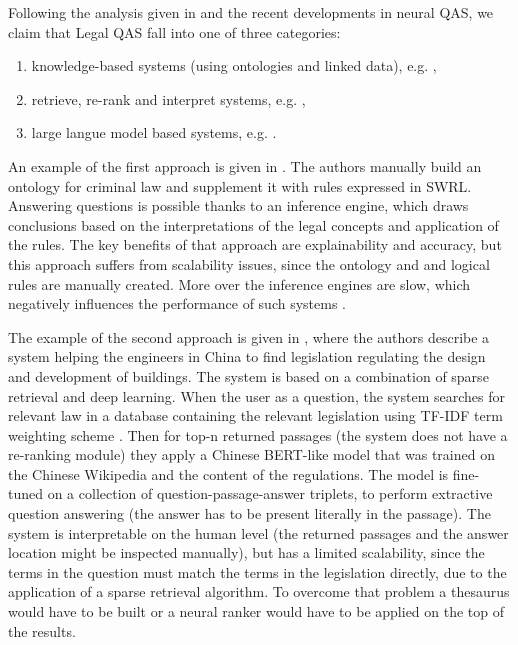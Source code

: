 Following the analysis given in \cite{martinez2023survey} and the recent developments in neural QAS, 
we claim that Legal QAS fall into one of three categories:
\begin{enumerate}
    \item knowledge-based systems (using ontologies and linked data), e.g. \cite{fawei2018methodology},
    \item retrieve, re-rank and interpret systems, e.g. \cite{zhong2020building},
    \item large langue model based systems, e.g. \cite{chung2022scaling}.
\end{enumerate}

An example of the first approach is given in \cite{fawei2018methodology}. The authors manually build an ontology
for criminal law and supplement it with rules expressed in SWRL. Answering questions is possible thanks
to an inference engine, which draws conclusions based on the interpretations of the legal concepts and 
application of the rules. The key benefits of that approach are explainability and accuracy, but this approach
suffers from scalability issues, since the ontology and and logical rules are manually created. More over 
the inference engines are slow, which negatively influences the performance of such systems \cite{martinez2023survey}.

The example of the second approach is given in \cite{zhong2020building}, where the authors describe a system
helping the engineers in China to find legislation regulating the design and development of buildings.
The system is based on a combination of sparse retrieval and deep learning. When the user as a question,
the system searches for relevant law in a database containing the relevant legislation using TF-IDF term
weighting scheme \cite{manning1999foundations}. Then for top-n returned passages (the system does not have a re-ranking
module) they apply a Chinese BERT-like model that was trained on the Chinese Wikipedia and the content of the 
regulations. The model is fine-tuned on a collection of question-passage-answer triplets, to 
perform extractive question answering (the answer has to be present literally in the passage). The system is interpretable
on the human level (the returned passages and the answer location might be inspected manually), but has a limited scalability,
since the terms in the question must match the terms in the legislation directly, due to the application of 
a sparse retrieval algorithm. To overcome that problem a thesaurus would have to be built or a neural ranker would have
to be applied on the top of the results.

